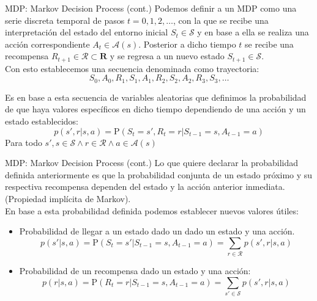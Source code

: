 \documentclass[10pt]{beamer}
\begin{document}
        \begin{frame}{MDP: Markov Decision Process (cont.)}
            Podemos definir a un MDP como una serie discreta temporal de pasos $t = 0, 1, 2, \dots$, con la que se recibe una interpretación del estado del entorno inicial $S_t \in \mathcal{S}$ y en base a ella se realiza una acción correspondiente $A_t \in \mathcal{A}(s)$. Posterior a dicho tiempo $t$ se recibe una recompensa $R_{t+1} \in \mathcal{R} \subset \mathbf{R}$ y se regresa a un nuevo estado $S_{t+1} \in \mathcal{S}$. \\
            \vspace{0.3cm}
            Con esto establecemos una secuencia denominada como trayectoria:
            \[
            S_0, A_0, R_1, S_1, A_1, R_2, S_2, A_2, R_3, S_3, \dots
            \]
            
            Es en base a esta secuencia de variables aleatorias que definimos la probabilidad de que haya valores específicos en dicho tiempo dependiendo de una acción y un estado establecidos:
            \[
            p\left( s', r | s, a\right) = \mathrm{P}(S_t = s', R_t = r | S_{t-1} = s, A_{t-1} = a)
            \]
            Para todo $s', s \in \mathcal{S} \wedge r \in \mathcal{R} \wedge a \in \mathcal{A}(s) $
        \end{frame}

        \begin{frame}{MDP: Markov Decision Process (cont.)}
            Lo que quiere declarar la probabilidad definida anteriormente es que la probabilidad conjunta de un estado próximo y su respectiva recompensa dependen del estado y la acción anterior inmediata. (Propiedad implícita de Markov).\\
            \vspace{0.3cm}
            En base a esta probabilidad definida podemos establecer nuevos valores útiles:
           
            \begin{itemize}
                \item Probabilidad de llegar a un estado dado un dado un estado y una acción.
                \[
                p(s'|s,a) = \mathrm{P}(S_t = s' | S_{t-1}=s, A_{t-1} = a) = \sum_{r \in \mathcal{R}} p(s',r | s,a)
                \]
                \item Probabilidad de un recompensa dado un estado y una acción: 
                \[
                p(r|s,a) = \mathrm{P}(R_t = r | S_{t-1}=s, A_{t-1} = a) = \sum_{s' \in \mathcal{S}} p(s',r | s,a)
                \]
            \end{itemize}
        \end{frame}
\end{document}
